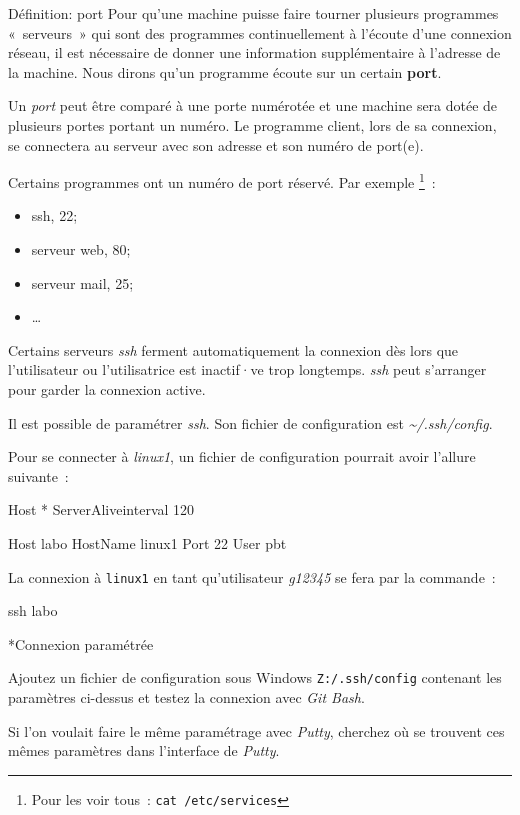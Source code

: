 \documentclass[a4paper,11pt]{article}
\begin{document}
\begin{coltbox}{Définition: port}
	Pour qu'une machine puisse faire tourner plusieurs programmes «~serveurs~»
	qui sont des programmes continuellement à l'écoute d'une connexion réseau,
	il est nécessaire de donner une information supplémentaire à l'adresse de la
	machine. Nous dirons qu'un programme écoute sur un certain \textbf{port}. 

	Un \textit{port} peut être comparé à une porte numérotée et une machine sera
	dotée de plusieurs portes portant un numéro. Le programme client, lors de sa
	connexion, se connectera au serveur avec son adresse et son numéro de
	port(e). 

	Certains programmes ont un numéro de port réservé. Par exemple
	\footnote{Pour les voir tous~: \texttt{cat /etc/services}}~:
	\begin{itemize}
		\item ssh, 22;
		\item serveur web, 80;
		\item serveur mail, 25;
		\item …
	\end{itemize}
\end{coltbox}
\vspace{5mm}

Certains serveurs \textit{ssh} ferment automatiquement la
connexion dès lors que l'utilisateur ou l'utilisatrice est inactif·ve trop
longtemps. \textit{ssh} peut s'arranger pour garder la connexion active. 

Il est possible de paramétrer \textit{ssh}. Son fichier de configuration est
\textit{\textasciitilde/.ssh/config}. 

Pour se connecter à \textit{linux1}, un fichier de configuration pourrait avoir
l'allure suivante~:

\begin{Console}
	Host * 
		ServerAliveinterval 120

	Host labo
		HostName linux1
		Port 22
		User pbt
\end{Console}

La connexion à \texttt{linux1} en tant qu'utilisateur \textit{g12345} se fera
par la commande~: 

\begin{term}
	ssh labo
\end{term}

\begin{Exercice}*{Connexion paramétrée}

	Ajoutez un fichier de configuration sous Windows \texttt{Z:/.ssh/config}
	contenant les paramètres ci-dessus et testez la connexion avec \textit{Git
	Bash}.

	Si l'on voulait faire le même paramétrage avec \textit{Putty}, cherchez où
	se trouvent ces mêmes paramètres dans l'interface de \textit{Putty}.

\end{Exercice}
\end{document}
